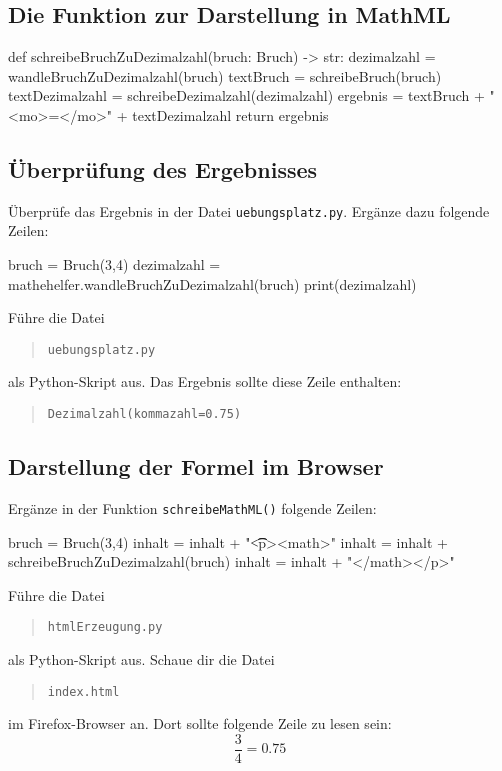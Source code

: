 \subsection*{Die Funktion zur Darstellung in MathML}

\begin{codePython}
def schreibeBruchZuDezimalzahl(bruch: Bruch) -> str:
	dezimalzahl = wandleBruchZuDezimalzahl(bruch)
	textBruch = schreibeBruch(bruch)
	textDezimalzahl = schreibeDezimalzahl(dezimalzahl)
	ergebnis = textBruch + "<mo>=</mo>" + textDezimalzahl
	return ergebnis
\end{codePython}

\subsection*{Überprüfung des Ergebnisses}

Überprüfe das Ergebnis in der Datei \texttt{uebungsplatz.py}. Ergänze dazu folgende Zeilen:

\begin{codePython}
bruch = Bruch(3,4)
dezimalzahl = mathehelfer.wandleBruchZuDezimalzahl(bruch)
print(dezimalzahl)
\end{codePython}

Führe die Datei
\begin{quote}
\texttt{uebungsplatz.py}
\end{quote}
als Python-Skript aus. Das Ergebnis sollte diese Zeile enthalten:
\begin{quote}
\texttt{Dezimalzahl(kommazahl=0.75)}
\end{quote} 

\subsection*{Darstellung der Formel im Browser}

Ergänze in der Funktion \texttt{schreibeMathML()} folgende Zeilen:

\begin{codePython}    
bruch = Bruch(3,4)
inhalt = inhalt + "\n\t\t<p><math>"
inhalt = inhalt + schreibeBruchZuDezimalzahl(bruch)
inhalt = inhalt +  "</math></p>"
\end{codePython}

Führe die Datei
\begin{quote}
\texttt{htmlErzeugung.py}
\end{quote}
als Python-Skript aus. Schaue dir die Datei
\begin{quote}
\texttt{index.html}
\end{quote} im Firefox-Browser an. Dort sollte folgende Zeile zu lesen sein:
\[
\frac{3}{4} = 0.75
\]

